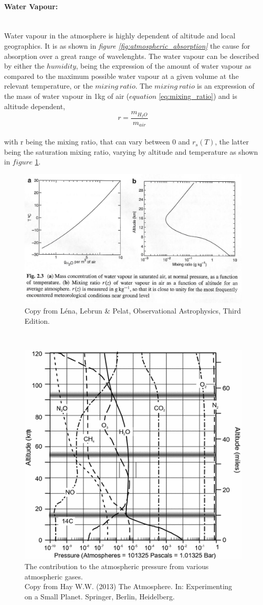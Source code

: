 \documentclass[a4paper, 12pt, twoside]{article}
\begin{document}
\paragraph[Water Vapour:]{Water Vapour:}\mbox{}\\
Water vapour in the atmosphere is highly dependent of altitude and local geographics. It is as shown in \emph{figure \ref{fig:atmospheric_absorption}} the cause for absorption over a great range of wavelenghts. The water vapour can be described by either the $humidity$, being the expression of the amount of water vapour as compared to the maximum possible water vapour at a given volume at the relevant temperature, or the $mixing\ ratio$. The $mixing\ ratio$ is an expression of the mass of water vapour in 1kg of air ($equation$ \ref{eq:mixing_ratio}) and is altitude dependent, 
\begin{equation}
r = \frac{m_{H_{2}O}}{m_{air}}
\label{eq:mixing_ratio}
\end{equation}\\
with r being the mixing ratio, that can vary between 0 and $r_{s}(T)$, the latter being the saturation mixing ratio, varying by altitude and temperature as shown in $figure$ \ref{fig:mixing_saturation_ratio}.
\begin{figure}[t!]
\center
\includegraphics[width=1.\linewidth]{Figure/water_vapour.png}
\caption{Copy from Léna, Lebrun \& Pelat, Observational Astrophysics, Third Edition.}
\label{fig:mixing_saturation_ratio}
\end{figure}\\
\begin{figure}[t!]
\center
\includegraphics[width=.4\linewidth]{Figure/atmospheric_gases.png}
\caption{The contribution to the atmospheric pressure from various atmospheric gases. \\Copy from Hay W.W. (2013) The Atmosphere. In: Experimenting on a Small Planet. Springer, Berlin, Heidelberg.}
\label{fig:atmospheric_gases}
\end{figure}\\
\end{document}
